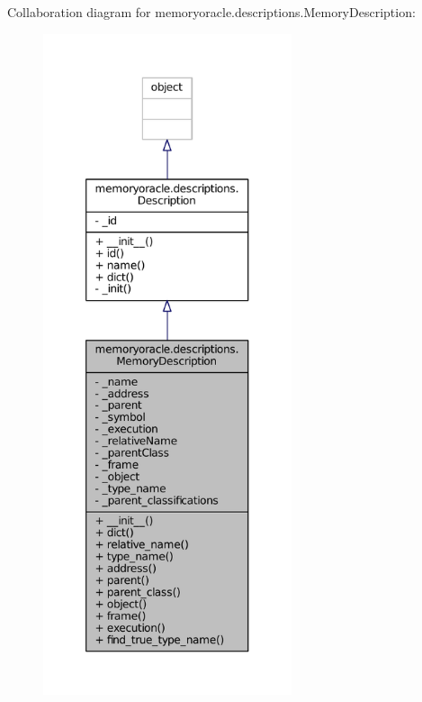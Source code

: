 Collaboration diagram for memoryoracle.\+descriptions.\+Memory\+Description\+:
\nopagebreak
\begin{figure}[H]
\begin{center}
\leavevmode
\includegraphics[height=550pt]{classmemoryoracle_1_1descriptions_1_1MemoryDescription__coll__graph}
\end{center}
\end{figure}
